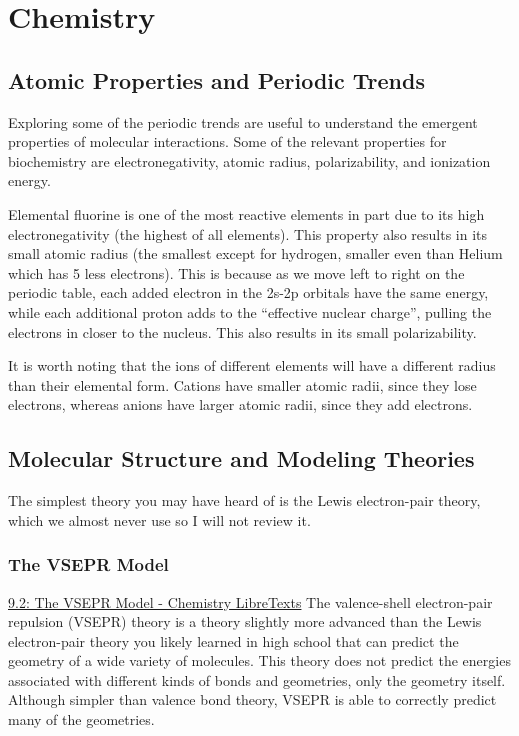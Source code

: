 \chapter{Chemistry} \label{chem_foundations}

\section{Atomic Properties and Periodic Trends}

Exploring some of the periodic trends are useful to understand the emergent properties of molecular interactions. Some of the relevant properties for biochemistry are electronegativity, atomic radius, polarizability, and ionization energy. 

Elemental fluorine is one of the most reactive elements in part due to its high electronegativity (the highest of all elements). This property also results in its small atomic radius (the smallest except for hydrogen, smaller even than Helium which has 5 less electrons). This is because as we move left to right on the periodic table, each added electron in the 2s-2p orbitals have the same energy, while each additional proton adds to the “effective nuclear charge”, pulling the electrons in closer to the nucleus. This also results in its small polarizability.

It is worth noting that the ions of different elements will have a different radius than their elemental form. Cations have smaller atomic radii, since they lose electrons, whereas anions have larger atomic radii, since they add electrons.




\section{Molecular Structure and Modeling Theories}

The simplest theory you may have heard of is the Lewis electron-pair theory, which we almost never use so I will not review it.

\subsection{The VSEPR Model}
\href{https://chem.libretexts.org/Bookshelves/General_Chemistry/Map%3A_Chemistry_-_The_Central_Science_(Brown_et_al.)/09%3A_Molecular_Geometry_and_Bonding_Theories/9.02%3A_The_VSEPR_Model}{9.2: The VSEPR Model - Chemistry LibreTexts}
The valence-shell electron-pair repulsion (VSEPR) theory is a theory slightly more advanced than the Lewis electron-pair theory you likely learned in high school that can predict the geometry of a wide variety of molecules. This theory does not predict the energies associated with different kinds of bonds and geometries, only the geometry itself. Although simpler than valence bond theory, VSEPR is able to correctly predict many of the geometries.

